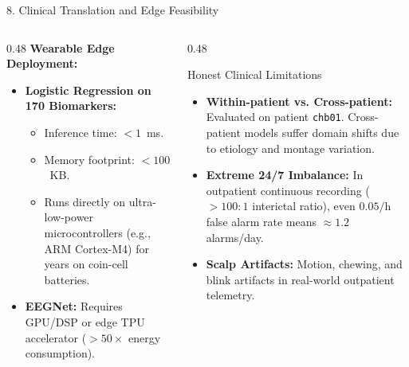 \documentclass[aspectratio=169,10pt]{beamer}
\begin{document}
\begin{frame}{8. Clinical Translation and Edge Feasibility}
\begin{columns}[T]
\begin{column}{0.48\textwidth}
\textbf{Wearable Edge Deployment:}
\begin{itemize}
    \item \textbf{Logistic Regression on 170 Biomarkers:}
    \begin{itemize}
        \item Inference time: $<1$~ms.
        \item Memory footprint: $<100$~KB.
        \item Runs directly on ultra-low-power microcontrollers (e.g., ARM Cortex-M4) for years on coin-cell batteries.
    \end{itemize}
    \item \textbf{EEGNet:} Requires GPU/DSP or edge TPU accelerator ($>50\times$ energy consumption).
\end{itemize}
\end{column}

\begin{column}{0.48\textwidth}
\begin{alertblock}{Honest Clinical Limitations}
\begin{itemize}
    \item \textbf{Within-patient vs. Cross-patient:} Evaluated on patient \texttt{chb01}. Cross-patient models suffer domain shifts due to etiology and montage variation.
    \item \textbf{Extreme 24/7 Imbalance:} In outpatient continuous recording ($>100:1$ interictal ratio), even $0.05/\text{h}$ false alarm rate means $\approx 1.2$ alarms/day.
    \item \textbf{Scalp Artifacts:} Motion, chewing, and blink artifacts in real-world outpatient telemetry.
\end{itemize}
\end{alertblock}
\end{column}
\end{columns}
\end{frame}
\end{document}
